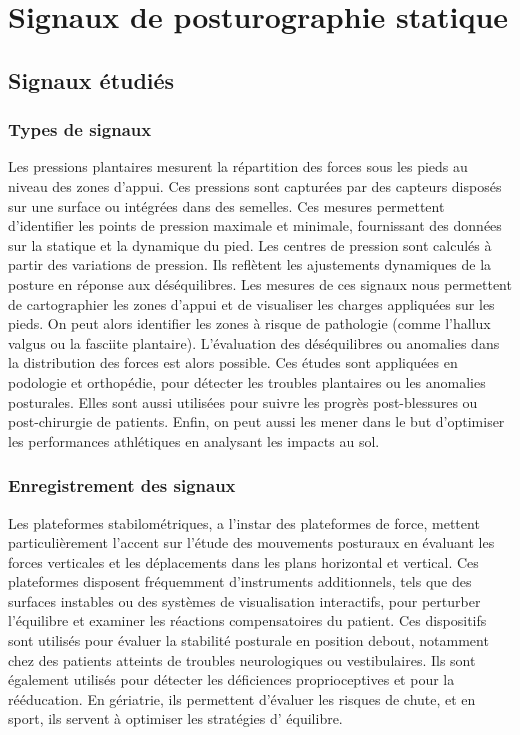 \section{Signaux de posturographie statique}

\subsection{Signaux étudiés}

\subsubsection{Types de signaux}
Les pressions plantaires mesurent la répartition des forces sous les pieds au 
niveau des zones d’appui. Ces pressions sont capturées par des capteurs disposés 
sur une surface ou intégrées dans des semelles. Ces mesures permettent 
d’identifier les points de pression maximale et minimale, fournissant des données 
sur la statique et la dynamique du pied. Les centres de pression sont calculés à 
partir des variations de pression. Ils reflètent les ajustements dynamiques de la 
posture en réponse aux déséquilibres. Les mesures de ces signaux nous permettent 
de cartographier les zones d'appui et de visualiser les charges appliquées sur les
pieds. On peut alors identifier les zones à risque de pathologie (comme l’hallux 
valgus ou la fasciite plantaire). L'évaluation des déséquilibres ou anomalies dans 
la distribution des forces est alors possible. Ces études sont appliquées en 
podologie et orthopédie, pour détecter les troubles plantaires ou les anomalies 
posturales. Elles sont aussi utilisées pour suivre les progrès post-blessures ou 
post-chirurgie de patients. Enfin, on peut aussi les mener dans le but d’optimiser 
les performances athlétiques en analysant les impacts au sol.

\subsubsection{Enregistrement des signaux}
Les plateformes stabilométriques, a l’instar des plateformes de force, mettent 
particulièrement l’accent sur l'étude des mouvements posturaux en évaluant les 
forces verticales et les déplacements dans les plans horizontal et vertical. Ces 
plateformes disposent fréquemment d’instruments additionnels, tels que des surfaces 
instables ou des systèmes de visualisation interactifs, pour perturber l'équilibre 
et examiner les réactions compensatoires du patient. Ces dispositifs sont utilisés 
pour évaluer la stabilité posturale en position debout, notamment chez des patients 
atteints de troubles neurologiques ou vestibulaires. Ils sont également utilisés 
pour détecter les déficiences proprioceptives et pour la rééducation. En gériatrie, 
ils permettent d'évaluer les risques de chute, et en sport, ils servent à optimiser 
les stratégies d' équilibre.\\ 

